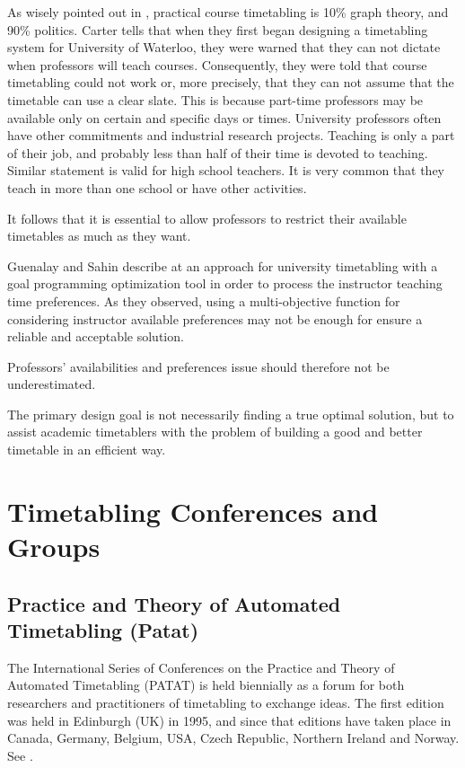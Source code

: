 As wisely pointed out in \cite{Carter2001}, practical course timetabling is 10\% graph theory, and 90\% politics. Carter tells that when they first began designing a timetabling system for University of Waterloo, they were warned that they can not dictate when professors will teach courses. Consequently, they were told that course timetabling could not work or, more precisely, that they can not assume that the timetable can use a clear slate. This is because part-time professors may be available only on certain and specific days or times. University professors often have other commitments and industrial research projects. Teaching is only a part of their job, and probably less than half of their time is devoted to teaching. Similar statement is valid for high school teachers. It is very common that they teach in more than one school or have other activities.

It follows that it is essential to allow professors to restrict their available timetables as much as they want.

Guenalay and Sahin describe at \cite{Guenalay2006} an approach for university timetabling with a goal programming optimization tool in order to process the instructor teaching time preferences. As they observed, using a multi-objective function for considering instructor available preferences may not be enough for ensure a reliable and acceptable solution.

Professors' availabilities and preferences issue should therefore not be underestimated.

The primary design goal is not necessarily finding a true optimal solution, but to assist academic timetablers with the problem of building a good and better timetable in an efficient way.


\section{Timetabling Conferences and Groups}


\subsection{Practice and Theory of Automated Timetabling (Patat)}
\label{patat}
The International Series of Conferences on the Practice and Theory of Automated Timetabling (PATAT) is held biennially as a forum for both researchers and practitioners of timetabling to exchange ideas. The first edition was held in Edinburgh (UK) in 1995, and since that editions have taken place in Canada, Germany, Belgium, USA, Czech Republic, Northern Ireland and Norway. See \cite{Patat}.

